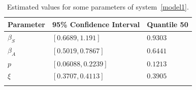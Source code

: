 




\begin{table}[h!]
\begin{center}
    \begin{tabular}{>{\centering}p{}p{}p{}}
        \toprule
        Parameter & 95\% Confidence Interval & Quantile 50
        \\
        \midrule
        $\beta_S$ & $[\num{0.6689}, \num{1.191}]$   &  $\num{0.9303}$
        \\
        $\beta_A$ & $[\num{0.5019}, \num{0.7867}]$  &  $\num{0.6441}$
        \\
        $p$       & $[\num{0.06088}, \num{0.2239}]$ &  $\num{0.1213}$
        \\
        $\xi$     & $[\num{0.3707}, \num{0.4113}]$  & $\num{0.3905}$
        \\
        \\
    \bottomrule
\end{tabular}
  \caption{Estimated values for some parameters of system~\ref{model1}.}\label{table_icparam}
\end{center}
\end{table}

